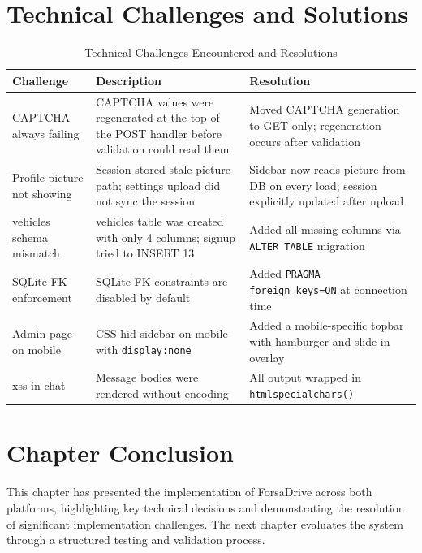 \documentclass[12pt,a4paper,openright]{report}
\begin{document}
\section{Technical Challenges and Solutions}

\begin{table}[H]
\centering
\caption{Technical Challenges Encountered and Resolutions}
\label{tab:challenges}
\begin{tabularx}{\textwidth}{l X X}
\toprule
\textbf{Challenge} & \textbf{Description} & \textbf{Resolution} \\
\midrule
CAPTCHA always failing & CAPTCHA values were regenerated at the top of the POST handler before validation could read them & Moved CAPTCHA generation to GET-only; regeneration occurs after validation \\
Profile picture not showing & Session stored stale picture path; settings upload did not sync the session & Sidebar now reads picture from DB on every load; session explicitly updated after upload \\
vehicles schema mismatch & vehicles table was created with only 4 columns; signup tried to INSERT 13 & Added all missing columns via \texttt{ALTER TABLE} migration \\
SQLite FK enforcement & SQLite FK constraints are disabled by default & Added \texttt{PRAGMA foreign\_keys=ON} at connection time \\
Admin page on mobile & CSS hid sidebar on mobile with \texttt{display:none} & Added a mobile-specific topbar with hamburger and slide-in overlay \\
\gls{xss} in chat & Message bodies were rendered without encoding & All output wrapped in \texttt{htmlspecialchars()} \\
\bottomrule
\end{tabularx}
\end{table}

\section*{Chapter Conclusion}

This chapter has presented the implementation of ForsaDrive across both platforms, highlighting key technical decisions and demonstrating the resolution of significant implementation challenges. The next chapter evaluates the system through a structured testing and validation process.
\end{document}
